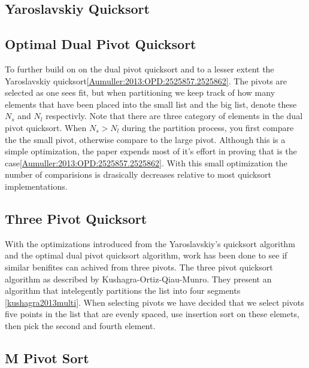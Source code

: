 	
	\subsection{Yaroslavskiy Quicksort}    
        \label{subsec:YaroslavskiyQSortIntro}
		
		

    \subsection{Optimal Dual Pivot Quicksort}	
		\label{subsec:OptimalDualPivotQSortIntro}
		To further build on on the dual pivot quicksort and to a lesser extent the Yaroslavskiy quicksort\ref{Aumuller:2013:OPD:2525857.2525862}. The pivots are selected as one sees fit, but when partitioning we keep track of how many elements that have been placed into the small list and the big list, denote these $N_s$ and $N_l$ respectivly. Note that there are three category of elements in the dual pivot quicksort. When $N_s > N_l$ during the partition process, you first compare the the small pivot, otherwise compare to the large pivot. Although this is a simple optimization, the paper expends most of it's effort in proving that is the case\ref{Aumuller:2013:OPD:2525857.2525862}. With this small optimization the number of comparisions is drasically decreases relative to most quicksort implementations.
		
	\subsection{Three Pivot Quicksort}	
		\label{subsec:ThreePivotQSortIntro}	
		With the optimizations introduced from the Yaroslavskiy's quicksort algorithm and the optimal dual pivot quicksort algorithm, work has been done to see if similar benifites can achived from three pivots. The three pivot quicksort algorithm as described by Kushagra-Ortiz-Qiau-Munro. They present an algorithm that intelegently partitions the list into four segments \ref{kushagra2013multi}. When selecting pivots we have decided that we select pivots five points in the list that are evenly spaced, use insertion sort on these elemets, then pick the second and fourth element.
		
	\subsection{M Pivot Sort}	
		\label{subsec:MPivotQSortIntro}
		
